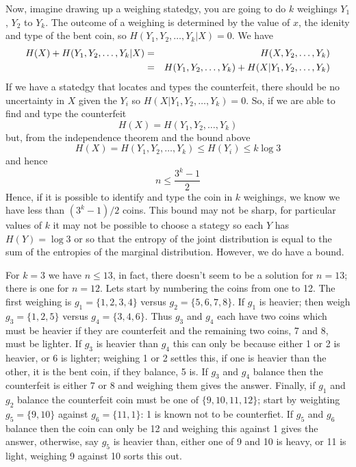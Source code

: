 \documentclass[12pt]{article}
\begin{document}
Now, imagine drawing up a weighing statedgy, you are going to do $k$
weighings $Y_1$, $Y_2$ to $Y_k$. The outcome of a weighing is determined by the value of
$x$, the idenity and type of the bent coin, so $H(Y_1,Y_2,\ldots, Y_k|X)=0$. We have
\begin{eqnarray}
  H(X)+H(Y_1,Y_2,\ldots, Y_k|X)&=&H(X,Y_2,\ldots, Y_k)\cr
  &=&H(Y_1,Y_2,\ldots,Y_k)+H(X|Y_1,Y_2,\ldots,Y_k)
\end{eqnarray}
If we have a statedgy that locates and types the counterfeit, there should be no uncertainty in $X$ given the $Y_i$ so 
$H(X|Y_1,Y_2,\ldots,Y_k)=0$. So, if we are able to find and type the counterfeit
\begin{equation}
H(X)=H(Y_1,Y_2,\ldots,Y_k)
\end{equation}
but, from the independence theorem and the bound above
\begin{equation}
H(X)=H(Y_1,Y_2,\ldots,Y_k)\le H(Y_i)\le k\log{3}
\end{equation}
and hence
\begin{equation}
n\le \frac{3^{k}-1}{2}
\end{equation}
Hence, if it is possible to identify and type the coin in $k$
weighings, we know we have less than $(3^k-1)/2$ coins. This bound may not
be sharp, for particular values of $k$ it may not be possible to
choose a stategy so each $Y$ has $H(Y)=\log{3}$ or so that the entropy
of the joint distribution is equal to the sum of the entropies of the
marginal distribution. However, we do have a bound.

For $k=3$ we have $n\le 13$, in fact, there doesn't seem to be a
solution for $n=13$; there is one for $n=12$. Lets start by numbering
the coins from one to 12. The first weighing is $g_1=\{1,2,3,4\}$
versus $g_2=\{5,6,7,8\}$. If $g_1$ is heavier; then weigh
$g_3=\{1,2,5\}$ versus $g_4=\{3,4,6\}$. Thus $g_3$ and $g_4$ each have
two coins which must be heavier if they are counterfeit and the
remaining two coins, 7 and 8, must be lighter. If $g_3$ is heavier
than $g_4$ this can only be because either 1 or 2 is heavier, or 6 is
lighter; weighing 1 or 2 settles this, if one is heavier than the
other, it is the bent coin, if they balance, 5 is. If $g_3$ and $g_4$
balance then the counterfeit is either 7 or 8 and weighing them gives
the answer. Finally, if $g_1$ and $g_2$ balance the counterfeit coin
must be one of $\{9,10,11,12\}$; start by weighting $g_5=\{9,10\}$
against $g_6=\{11,1\}$: 1 is known not to be counterfiet. If $g_5$ and
$g_6$ balance then the coin can only be 12 and weighing this against 1
gives the answer, otherwise, say $g_5$ is heavier than, either one of
9 and 10 is heavy, or 11 is light, weighing 9 against 10 sorts this
out.
\end{document}

